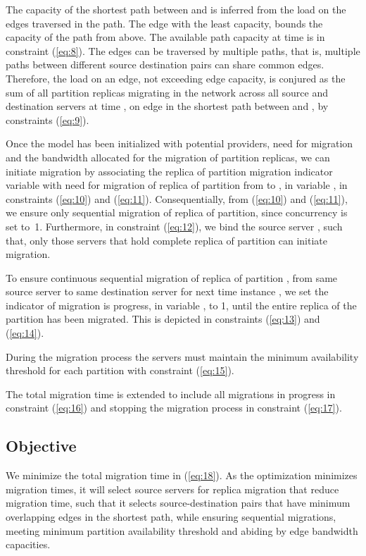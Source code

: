 The capacity of the shortest path between  and  is inferred from the load on the edges traversed in the path. The edge with the least capacity, bounds the capacity of the path from above. The available path capacity at time  is in constraint (\ref{eq:8}). The edges can be traversed by multiple paths, that is, multiple paths between different source destination pairs can share common edges. Therefore, the load on an edge, not exceeding edge capacity, is conjured as the sum of all partition replicas migrating in the network across all source and destination servers at time , on edge  in the shortest path between  and , by constraints (\ref{eq:9}).
\vspace{-3mm}

\vspace{-10mm}

Once the model has been initialized with potential providers, need for migration and the bandwidth allocated for the migration of partition replicas, we can initiate migration by associating the replica of partition migration indicator variable  with need for migration of replica of partition  from  to , in variable , in constraints (\ref{eq:10}) and (\ref{eq:11}). Consequentially, from (\ref{eq:10}) and (\ref{eq:11}), we ensure only sequential migration of replica of partition, since concurrency is set to~1. Furthermore, in constraint (\ref{eq:12}), we bind the source server , such that, only those servers that hold complete replica of partition  can initiate migration.  



To ensure continuous sequential migration of replica of partition , from same source server  to same destination server  for next time instance , we set the indicator of migration is progress, in variable , to 1, until the entire replica of the partition has been migrated. This is depicted in constraints (\ref{eq:13}) and (\ref{eq:14}). 
\vspace{-5mm}

\vspace{-10mm}

During the migration process the servers must maintain the minimum availability threshold for each partition with constraint (\ref{eq:15}).

The total migration time is extended to include all migrations in progress in constraint (\ref{eq:16}) and stopping the migration process in constraint (\ref{eq:17}).
\vspace{-3mm}


\vspace{-3mm}
\subsection{Objective}
\vspace{-5mm}

We minimize the total migration time in (\ref{eq:18}). As the optimization minimizes migration times, it will select source servers for replica migration that reduce migration time, such that it selects source-destination pairs that have minimum overlapping edges in the shortest path, while ensuring sequential migrations, meeting minimum partition availability threshold and abiding by edge bandwidth capacities.